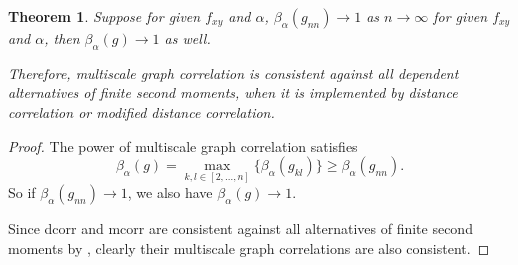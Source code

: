 \documentclass[11pt]{article}
\newtheorem{thm}{Theorem}
\begin{document}

\begin{thm}
Suppose for given $f_{xy}$ and $\alpha$, $\beta_{\alpha}(g_{nn}) \rightarrow 1$ as $n \rightarrow \infty$ for given $f_{xy}$ and $\alpha$, then $\beta_{\alpha}(g) \rightarrow 1$ as well.

Therefore, multiscale graph correlation is consistent against all dependent alternatives of finite second moments, when it is implemented by distance correlation or modified distance correlation.
\end{thm}
\begin{proof}
The power of multiscale graph correlation satisfies
\begin{equation}
\beta_{\alpha}(g)=\max_{k,l \in [2,\ldots,n]}\{\beta_{\alpha}(g_{kl})\} \geq \beta_{\alpha}(g_{nn}).
\end{equation}
So if $\beta_{\alpha}(g_{nn}) \rightarrow 1$, we also have $\beta_{\alpha}(g) \rightarrow 1$.

Since dcorr and mcorr are consistent against all alternatives of finite second moments by \cite{SzekelyRizzoBakirov2007, SzekelyRizzo2013a}, clearly their multiscale graph correlations are also consistent.
\end{proof}
\end{document}
